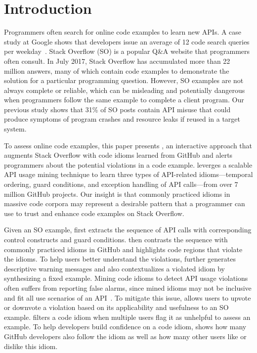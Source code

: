 \section{Introduction}
\label{sec:intro}
Programmers often search for online code examples to learn new APIs. A case study at Google shows that developers issue an average of 12 code search queries per weekday~\cite{sadowski2015developers}. Stack Overflow (SO) is a popular Q\&A website that programmers often consult. In July 2017, Stack Overflow has accumulated more than 22 million answers, many of which contain code examples to demonstrate the solution for a particular programming question. However, SO examples are not always complete or reliable, which can be misleading and potentially dangerous when programmers follow the same example to complete a client program. Our previous study shows that 31\% of SO posts contain API misuse that could produce symptoms of program crashes and resource leaks if reused in a target system. %

To assess online code examples, this paper presents {\soa}, an interactive approach that augments Stack Overflow with code idioms learned from GitHub and alerts programmers about the potential violations in a code example. {\soa} leverges a scalable API usage mining technique to learn three types of API-related idioms---temporal ordering, guard conditions, and exception handling of API calls---from over 7 million GitHub projects. Our insight is that commonly practiced idioms in massive code corpora may represent a desirable pattern that a programmer can use to trust and enhance code examples on Stack Overflow. 

Given an SO example, {\soa} first extracts the sequence of API calls with corresponding control constructs and guard conditions. {\soa} then contrasts the sequence with commonly practiced idioms in GitHub and highlights code regions that violate the idioms. To help users better understand the violations, {\soa} further generates descriptive warning messages and also contextualizes a violated idiom by synthesizing a fixed example. Mining code idioms to detect API usage violations often suffers from reporting false alarms, since mined idioms may not be inclusive and fit all use scenarios of an API~\cite{liang2016antminer}. To mitigate this issue, {\soa} allows users to upvote or downvote a violation based on its applicability and usefulness to an SO example. {\soa} filters a code idiom when multiple users flag it as unhelpful to assess an example. To help developers build confidence on a code idiom, {\soa} shows how many GitHub developers also follow the idiom as well as how many other users like or dislike this idiom.

